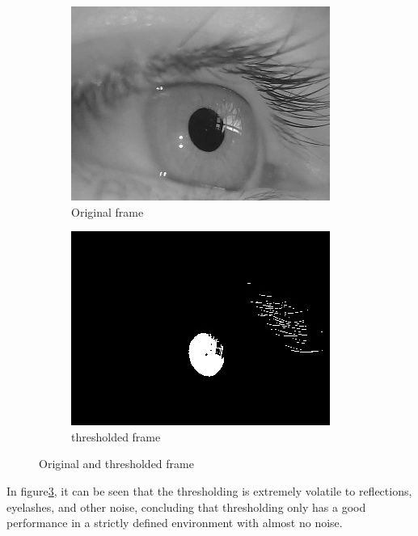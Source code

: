\begin{figure}[ht]
    \centering
    \begin{subfigure}{.5\textwidth}
      \centering
      \includegraphics[width=.9\linewidth]{plots/orig_canny.png}
      \caption{Original frame}
      \label{fig:th_orig}
    \end{subfigure}%
    \begin{subfigure}{.5\textwidth}
      \centering
      \includegraphics[width=.9\linewidth]{plots/thresholded.jpg}
      \caption{thresholded frame}
      \label{fig:th_thres}
    \end{subfigure}
    \caption{Original and thresholded frame}
    \label{fig:simple_thresh}
\end{figure}
In figure\ref{fig:simple_thresh}, it can be seen that the thresholding is extremely volatile to reflections, eyelashes, and other noise, concluding that thresholding only has a good performance in a strictly defined environment with almost no noise. 

